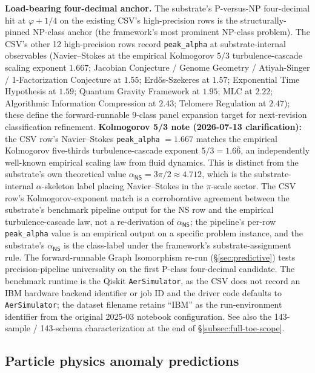 \documentclass[11pt,a4paper]{amsart}
\theoremstyle{plain}
\theoremstyle{definition}
\begin{document}
\textbf{Load-bearing four-decimal anchor.} The substrate's P-versus-NP four-decimal hit at $\varphi + 1/4$ on the existing CSV's high-precision rows is the structurally-pinned NP-class anchor (the framework's most prominent NP-class problem). The CSV's other 12 high-precision rows record \texttt{peak\_alpha} at substrate-internal observables (Navier--Stokes at the empirical Kolmogorov $5/3$ turbulence-cascade scaling exponent $1.667$; Jacobian Conjecture / Genome Geometry / Atiyah-Singer / 1-Factorization Conjecture at $1.55$; Erd\H{o}s-Szekeres at $1.57$; Exponential Time Hypothesis at $1.59$; Quantum Gravity Framework at $1.95$; MLC at $2.22$; Algorithmic Information Compression at $2.43$; Telomere Regulation at $2.47$); these define the forward-runnable 9-class panel expansion target for next-revision classification refinement. \textbf{Kolmogorov 5/3 note (2026-07-13 clarification):} the CSV row's Navier--Stokes \texttt{peak\_alpha} $= 1.667$ matches the empirical Kolmogorov five-thirds turbulence-cascade exponent $5/3 = 1.6\overline{6}$, an independently well-known empirical scaling law from fluid dynamics. This is distinct from the substrate's own theoretical value $\alpha_{\textsf{NS}} = 3\pi/2 \approx 4.712$, which is the substrate-internal $\alpha$-skeleton label placing Navier--Stokes in the $\pi$-scale sector. The CSV row's Kolmogorov-exponent match is a corroborative agreement between the substrate's benchmark pipeline output for the NS row and the empirical turbulence-cascade law, not a re-derivation of $\alpha_{\textsf{NS}}$; the pipeline's per-row \texttt{peak\_alpha} value is an empirical output on a specific problem instance, and the substrate's $\alpha_{\textsf{NS}}$ is the class-label under the framework's substrate-assignment rule. The forward-runnable Graph Isomorphism re-run (\S\ref{sec:predictive}) tests precision-pipeline universality on the first P-class four-decimal candidate. The benchmark runtime is the Qiskit \texttt{AerSimulator}, as the CSV does not record an IBM hardware backend identifier or job ID and the driver code defaults to \texttt{AerSimulator}; the dataset filename retains ``IBM'' as the run-environment identifier from the original 2025-03 notebook configuration. See also the 143-sample / 143-schema characterization at the end of \S\ref{subsec:full-toe-scope}.

\subsection{Particle physics anomaly predictions}
\end{document}
